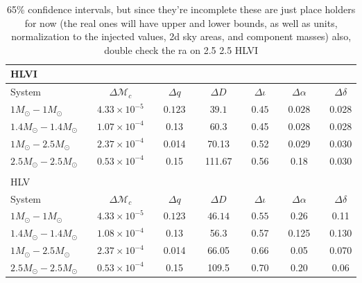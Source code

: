 \documentclass[11pt,a4paper]{emulateapj}
\newcommand{\carl}[1]{{\color{red}  #1}}
\newcommand{\chmass}{\mathcal{M}_c}
\begin{document}
\begin{table}[t!]
\centering
\caption{\carl{65\% confidence intervals, but since they're incomplete these are just place holders for now (the real ones will have upper and lower bounds, as well as units, normalization to the injected values, 2d sky areas, and component masses) also, double check the ra on 2.5 2.5 HLVI}}
\begin{tabular}{lcccccccccccc}

\\HLVI\\
\hline\hline
System & \vline &  $\Delta \chmass$ & \vline & $\Delta q$ & \vline & $\Delta D$ & \vline & $\Delta \iota$ & \vline & $\Delta \alpha$ & \vline &  $\Delta \delta$\\
\hline\hline
$1M_{\odot}-1M_{\odot}$ & \vline & $4.33\times10^{-5}$ & \vline & $0.123$& \vline & $39.1$ & \vline & $0.45$ & \vline & $0.028$ & \vline & 0.028\\
\hline
$1.4M_{\odot}-1.4M_{\odot}$ & \vline & $1.07\times10^{-4}$ & \vline & 0.13 & \vline & 60.3 & \vline & 0.45 & \vline & 0.028 & \vline & 0.028\\
\hline
$1M_{\odot}-2.5M_{\odot}$ & \vline & $2.37\times10^{-4}$ & \vline & 0.014 & \vline & 70.13 & \vline & 0.52 & \vline & 0.029 & \vline &0.030\\
\hline
$2.5M_{\odot}-2.5M_{\odot}$ & \vline & $0.53\times10^{-4}$ & \vline & 0.15 & \vline & 111.67 & \vline & 0.56 & \vline & 0.18 & \vline & 0.030 \\
\hline\hline

\\
HLV\\

\hline\hline
System & \vline &  $\Delta \chmass$ & \vline & $\Delta q$ & \vline & $\Delta D$ & \vline & $\Delta \iota$ & \vline & $\Delta \alpha$ & \vline &  $\Delta \delta$\\
\hline\hline
$1M_{\odot}-1M_{\odot}$ & \vline & $4.33\times10^{-5}$ & \vline & $0.123$& \vline & $46.14$ & \vline & $0.55$ & \vline & $0.26$ & \vline & 0.11\\
\hline
$1.4M_{\odot}-1.4M_{\odot}$ & \vline & $1.08\times10^{-4}$ & \vline & 0.13 & \vline & 56.3 & \vline & 0.57 & \vline & 0.125 & \vline & 0.130\\
\hline
$1M_{\odot}-2.5M_{\odot}$ & \vline & $2.37\times10^{-4}$ & \vline & 0.014 & \vline & 66.05 & \vline & 0.66 & \vline & 0.05 & \vline &0.070\\
\hline
$2.5M_{\odot}-2.5M_{\odot}$ & \vline & $0.53\times10^{-4}$ & \vline & 0.15 & \vline & 109.5 & \vline & 0.70 & \vline & 0.20 & \vline & 0.06 \\
\hline\hline


\end{tabular}
\label{ciTable}
\end{table}
\end{document}
